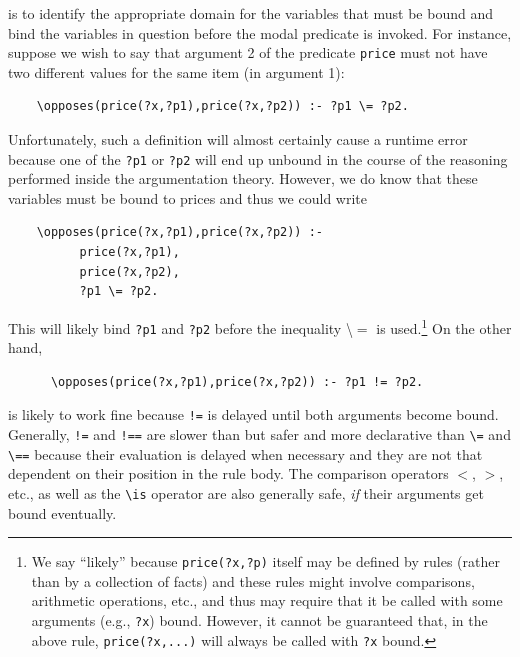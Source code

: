 \documentclass[11pt]{article}
\newcommand{\bs}{\textbackslash}
\begin{document}
\begin{itemize}
  is to identify the appropriate
  domain for the variables that must be bound and bind the variables in
  question before the modal predicate is invoked. For instance, suppose we
  wish to say that argument 2 of the predicate \texttt{price}  
  must not have two different values for the same item (in argument 1):
\begin{verbatim}
    \opposes(price(?x,?p1),price(?x,?p2)) :- ?p1 \= ?p2.
\end{verbatim}
  Unfortunately, such a definition will almost certainly cause a runtime error because one
  of the \texttt{?p1} or \texttt{?p2} will end up unbound in the course of
  the reasoning performed inside the argumentation theory.  
  However, we do know that these variables must be bound to
  prices and thus we could write
\begin{verbatim}
    \opposes(price(?x,?p1),price(?x,?p2)) :-
          price(?x,?p1),
          price(?x,?p2),
          ?p1 \= ?p2.
\end{verbatim}
  This will likely bind \texttt{?p1} and \texttt{?p2} before the
  inequality \bs$=$ is used.\footnote{
    We say ``likely'' because \texttt{price(?x,?p)} itself may be defined
    by rules (rather than by a collection of facts)
    and these rules might involve comparisons, arithmetic operations, etc., and thus
    may require that it be called with some arguments (e.g., \texttt{?x})
    bound. However, it cannot be guaranteed that, in the above rule,
    \texttt{price(?x,...)}  will always be called with \texttt{?x} bound. 
  }
  On the other hand,
\begin{verbatim}
      \opposes(price(?x,?p1),price(?x,?p2)) :- ?p1 != ?p2.
\end{verbatim}
  is likely to work fine because \texttt{!=} is delayed until both
  arguments become bound. Generally, \texttt{!=} and \texttt{!==} are
  slower than but safer and more declarative
  than \texttt{\bs{}=} and  \texttt{\bs{}==} because their evaluation is
  delayed when necessary and they are not that dependent on their position
  in the rule body. The comparison operators $<$, $>$, etc., as well as the
  \texttt{\bs{}is} operator are also generally safe, \emph{if} their
  arguments get bound eventually.  
\end{itemize}
\end{document}
